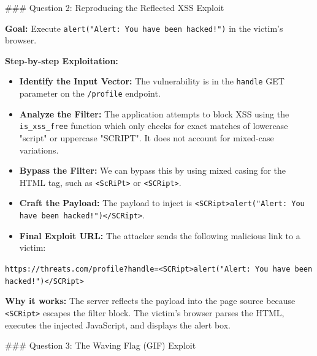 \documentclass{article}
\begin{document}
\#\#\# Question 2: Reproducing the Reflected XSS Exploit

\textbf{Goal:} Execute \texttt{alert("Alert: You have been hacked!")} in the victim's browser.

\textbf{Step-by-step Exploitation:}

\begin{itemize}
    \item[\textbf{1.}] \textbf{Identify the Input Vector:} The vulnerability is in the \texttt{handle} GET parameter on the \texttt{/profile} endpoint.
    \item[\textbf{2.}] \textbf{Analyze the Filter:} The application attempts to block XSS using the \texttt{is\_xss\_free} function which only checks for exact matches of lowercase "script" or uppercase "SCRIPT". It does not account for mixed-case variations.
    \item[\textbf{3.}] \textbf{Bypass the Filter:} We can bypass this by using mixed casing for the HTML tag, such as \texttt{<ScRiPt>} or \texttt{<SCRipt>}.
    \item[\textbf{4.}] \textbf{Craft the Payload:} The payload to inject is \texttt{<SCRipt>alert("Alert: You have been hacked!")</SCRipt>}.
    \item[\textbf{5.}] \textbf{Final Exploit URL:} The attacker sends the following malicious link to a victim:
\end{itemize}
\texttt{https://threats.com/profile?handle=<SCRipt>alert("Alert: You have been hacked!")</SCRipt>}

\textbf{Why it works:} The server reflects the payload into the page source because \texttt{<SCRipt>} escapes the filter block. The victim's browser parses the HTML, executes the injected JavaScript, and displays the alert box.

\#\#\# Question 3: The Waving Flag (GIF) Exploit
\end{document}
